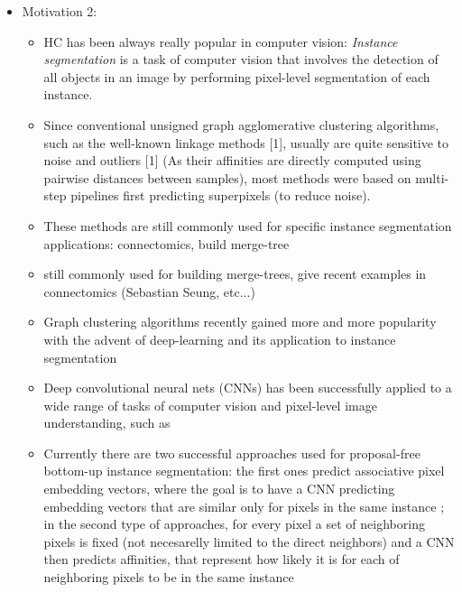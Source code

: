 \begin{itemize}
\item Motivation 2:
\begin{itemize}
\item HC has been always really popular in computer vision: \emph{Instance segmentation} is a task of computer vision that involves the detection of all objects in an image by performing pixel-level segmentation of each instance.   
\item Since conventional unsigned graph agglomerative clustering algorithms, such as the well-known linkage methods [1], usually are quite sensitive to noise and outliers [1] (As their affinities are directly computed using pairwise distances between samples), most methods were based on multi-step pipelines first predicting superpixels (to reduce noise).
\item These methods are still commonly used for specific instance segmentation applications: connectomics, build merge-tree 
\item still commonly used for building merge-trees, give recent examples in connectomics (Sebastian Seung, etc...) %
\item Graph clustering algorithms recently gained more and more popularity with the advent of deep-learning and its application to instance segmentation
\item Deep convolutional neural nets (CNNs) has been successfully applied to a wide range of tasks of computer vision and pixel-level image understanding, such as 

\item Currently there are two successful approaches used for proposal-free bottom-up instance segmentation: the first ones predict associative pixel embedding vectors, where the goal is to have a CNN predicting embedding vectors that are similar only for pixels in the same instance \cite{kong2018recurrent,fathi2017semantic,newell2017associative,de2017semantic}; in the second type of approaches, for every pixel a set of neighboring pixels is fixed  (not necesarelly limited to the direct neighbors) and a CNN then predicts affinities, that represent how likely it is for each of neighboring pixels to be in the same instance \cite{liu2018affinity,wolf2018mutex,xie2015holistically}


\end{itemize}
\end{itemize}
